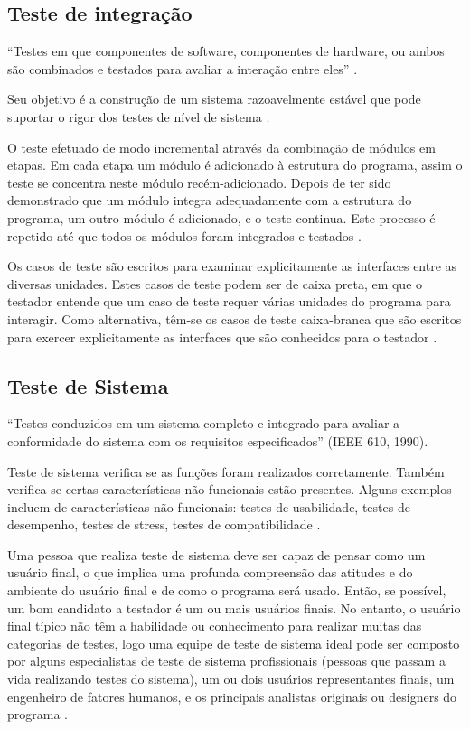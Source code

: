 \subsection{Teste de integração}

“Testes em que componentes de software, componentes de hardware, ou ambos são combinados e testados para avaliar a interação entre eles” \cite{ieee}.

Seu objetivo é a construção de um sistema razoavelmente estável que pode suportar o rigor dos testes de nível de sistema \cite[pág.~18]{naik2008}.

O teste  efetuado de modo incremental através da combinação de módulos em etapas. Em cada etapa um módulo é adicionado à estrutura do programa, assim o teste se concentra neste módulo recém-adicionado. Depois de ter sido demonstrado que um módulo integra adequadamente com a estrutura do programa, um outro módulo é adicionado, e o teste continua. Este processo é repetido até que todos os módulos foram integrados e testados \cite[pág.~134]{lewis2009}.

Os casos de teste são escritos para examinar explicitamente as interfaces entre as diversas unidades. Estes casos de teste podem ser de caixa preta, em que o testador entende que um caso de teste requer várias unidades do programa para interagir. Como alternativa, têm-se os casos de teste caixa-branca que são escritos para exercer explicitamente as interfaces que são conhecidos para o testador \cite{williams2006}.

\subsection{Teste de Sistema}

“Testes conduzidos em um sistema completo e integrado para avaliar a conformidade do sistema com os requisitos especificados” (IEEE 610, 1990).

Teste de sistema verifica se as funções foram realizados corretamente. Também verifica se certas características não funcionais estão presentes. Alguns exemplos incluem de características não funcionais: testes de usabilidade, testes de desempenho, testes de stress, testes de compatibilidade \cite[pág.~134]{lewis2009}.

Uma pessoa que realiza teste de sistema deve ser capaz de pensar como um usuário final, o que implica uma profunda compreensão das atitudes e do ambiente do usuário final e de como o programa será usado. Então, se possível, um bom candidato a testador é um ou mais usuários finais. No entanto, o usuário final típico não têm a habilidade ou conhecimento para realizar muitas das categorias de testes, logo uma equipe de teste de sistema ideal pode ser composto por alguns especialistas de teste de sistema profissionais (pessoas que  passam a vida realizando testes do sistema), um  ou dois usuários representantes finais, um engenheiro de fatores humanos, e os principais analistas originais ou designers do programa \cite[pág.~104]{myers2004}.

